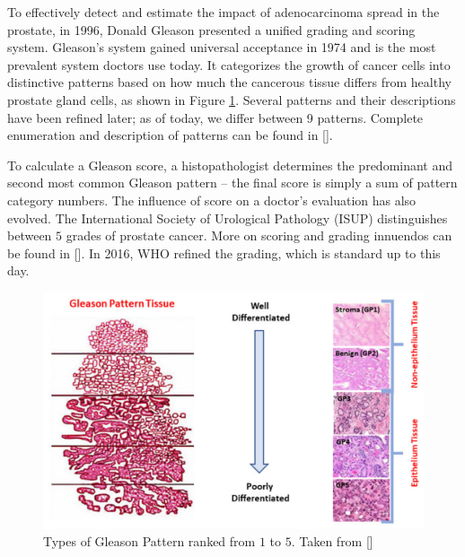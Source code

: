 To effectively detect and estimate the impact of adenocarcinoma spread in the prostate, in 1996, Donald Gleason presented a unified grading and scoring system. Gleason's system gained universal acceptance in 1974 and is the most prevalent system doctors use today. It categorizes the growth of cancer cells into distinctive patterns based on how much the cancerous tissue differs from healthy prostate gland cells, as shown in Figure \ref{fig:gp}. Several patterns and their descriptions have been refined later; as of today, we differ between 9 patterns. Complete enumeration and description of patterns can be found in [].

To calculate a Gleason score, a histopathologist determines the predominant and second most common Gleason pattern -- the final score is simply a sum of pattern category numbers. The influence of score on a doctor's evaluation has also evolved. The International Society of Urological Pathology (ISUP) distinguishes between $5$ grades of prostate cancer. More on scoring and grading innuendos can be found in []. In 2016, WHO refined the grading, which is standard up to this day.

\begin{figure}
    \begin{center}
    \begin{minipage}{1\textwidth}
      \includegraphics[width=\textwidth]{img/gp-classification.png}
    \end{minipage}
    \caption{Types of Gleason Pattern ranked from $1$ to $5$. Taken from []}
    \label{fig:gp}
    \end{center}
\end{figure}

